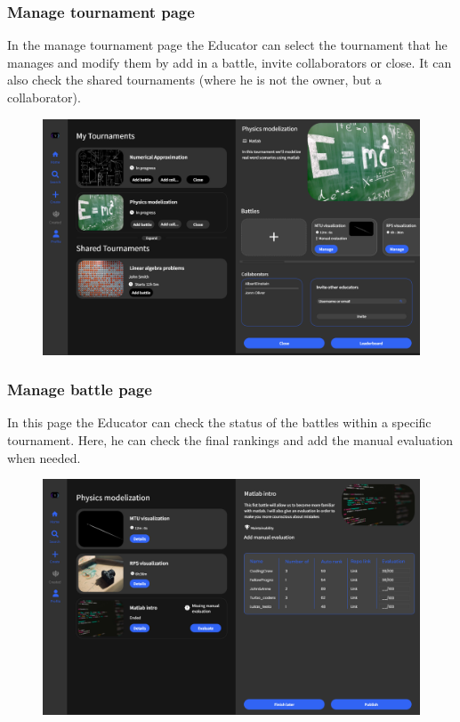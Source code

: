 \documentclass[12pt, a4paper]{report}
\begin{document}
    \subsubsection{Manage tournament page} 
    In the manage tournament page the Educator can select the tournament that he manages and modify them by add in a battle, invite collaborators or close. 
    It can also check the shared tournaments (where he is not the owner, but a collaborator). 
    \begin{figure}[H]
        \centering
        \includegraphics[width=0.8\linewidth]{images/manage_tournament.png}
    \end{figure}

    \subsubsection{Manage battle page} 
    In this page the Educator can check the status of the battles within a specific tournament. 
    Here, he can check the final rankings and add the manual evaluation when needed.
    \begin{figure}[H]
        \centering
        \includegraphics[width=0.8\linewidth]{images/manage_battle.png}
    \end{figure}
\end{document}
